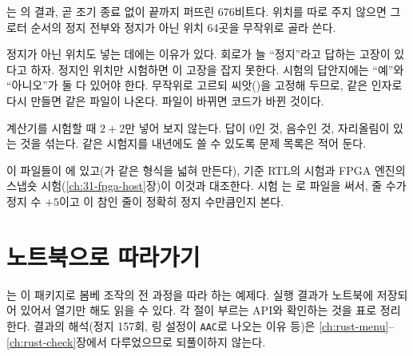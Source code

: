 는 의 결과, 곧 조기 종료 없이 끝까지 퍼뜨린 676비트다. 위치를 따로 주지 않으면
그 로터 순서의 정지 전부와 정지가 아닌 위치 64곳을 무작위로 골라 쓴다.

\Why 정지가 아닌 위치도 넣는 데에는 이유가 있다. 회로가 늘 ``정지''라고 답하는 고장이 있다고 하자. 정지인
위치만 시험하면 이 고장을 잡지 못한다. 시험의 답안지에는 ``예''와 ``아니오''가 둘 다 있어야 한다. 무작위로 고르되
씨앗()을 고정해 두므로, 같은 인자로 다시 만들면 같은 파일이 나온다. 파일이 바뀌면 코드가 바뀐 것이다.

\General 계산기를 시험할 때 $2+2$만 넣어 보지 않는다. 답이 0인 것, 음수인 것, 자리올림이 있는 것을 섞는다. 같은
시험지를 내년에도 쓸 수 있도록 문제 목록은 적어 둔다.

\Ours 이 파일들이 에 있고(가 같은 형식을 넓혀 만든다),
기준 RTL의  시험과 FPGA 엔진의 스냅숏 시험(\ref{ch:31-fpga-host}장)이 이것과 대조한다. 시험
는 로 파일을 써서, 줄 수가 정지 수 $+5$이고 이 참인 줄이
정확히 정지 수만큼인지 본다.

\section{노트북으로 따라가기}\label{sec:py-notebook}

는 이 패키지로 봄베 조작의 전 과정을 따라 하는 예제다. 실행 결과가
노트북에 저장되어 있어서 열기만 해도 읽을 수 있다. 각 절이 부르는 API와 확인하는 것을 표로 정리한다. 결과의
해석(정지 157회, 링 설정이 \texttt{AAC}로 나오는 이유 등)은 \ref{ch:rust-menu}--\ref{ch:rust-check}장에서
다루었으므로 되풀이하지 않는다.

